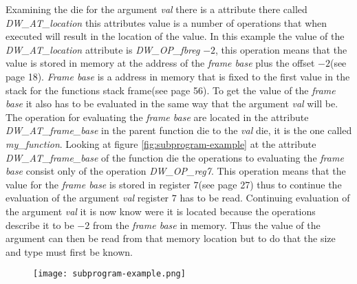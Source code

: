 Examining the \gls{die} for the argument \emph{val} there is a attribute there called \emph{DW\_AT\_location} this attributes value is a number of operations that when executed will result in the location of the value.
In this example the value of the \emph{DW\_AT\_location} attribute is \emph{DW\_OP\_fbreg} $-2$, this operation means that the value is stored in memory at the address of the \emph{frame base} plus the offset $-2$(see \cite{dwarf} page 18).
\emph{Frame base} is a address in memory that is fixed to the first value in the stack for the functions stack frame(see \cite{dwarf} page 56).
To get the value of the \emph{frame base} it also has to be evaluated in the same way that the argument \emph{val} will be.
The operation for evaluating the \emph{frame base} are located in the attribute \emph{DW\_AT\_frame\_base} in the parent function \gls{die} to the \emph{val} die, it is the one called \emph{my\_function}.
Looking at figure \ref{fig:subprogram-example} at the attribute \emph{DW\_AT\_frame\_base} of the function \gls{die} the operations to evaluating the \emph{frame base} consist only of the operation \emph{DW\_OP\_reg7}.
This operation means that the value for the \emph{frame base} is stored in register $7$(see \cite{dwarf} page 27) thus to continue the evaluation of the argument \emph{val} register $7$ has to be read.
Continuing evaluation of the argument \emph{val} it is now know were it is located because the operations describe it to be $-2$ from the \emph{frame base} in memory.
Thus the value of the argument can then be read from that memory location but to do that the size and type must first be known.


\begin{figure}[h]
    \centering
    \texttt{[image: subprogram-example.png]}
    \label{fig:subprogramexample}
\end{figure}


